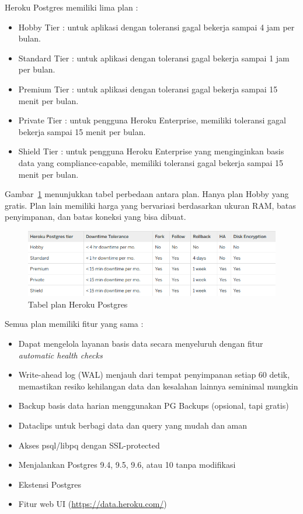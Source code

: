 \documentclass[a4paper,twoside]{article}
\begin{document}
\begin{enumerate}
\begin{enumerate}
\begin{itemize}
Heroku Postgres memiliki lima plan :
\begin{itemize}
\item Hobby Tier : untuk aplikasi dengan toleransi gagal bekerja sampai 4 jam per bulan.
\item Standard Tier : untuk aplikasi dengan toleransi gagal bekerja sampai 1 jam per bulan.
\item Premium Tier : untuk aplikasi dengan toleransi gagal bekerja sampai 15 menit per bulan.
\item Private Tier : untuk pengguna Heroku Enterprise, memiliki toleransi gagal bekerja sampai 15 menit per bulan.
\item Shield Tier : untuk pengguna Heroku Enterprise yang menginginkan basis data yang compliance-capable, memiliki toleransi gagal bekerja sampai 15 menit per bulan.
\end{itemize}

Gambar~\ref{fig:heroku-postgres-plan-table} menunjukkan tabel perbedaan antara plan. Hanya plan Hobby yang gratis. Plan lain memiliki harga yang bervariasi berdasarkan ukuran RAM, batas penyimpanan, dan batas koneksi yang bisa dibuat.
\begin{figure}[H]
	\centering  
	\includegraphics[scale=0.5]{Gambar/heroku-postgres-plan-table.png}  
	\caption[Tabel plan Heroku Postgres]{Tabel plan Heroku Postgres} 
	\label{fig:heroku-postgres-plan-table} 
\end{figure}

Semua plan memiliki fitur yang sama :
\begin{itemize}
\item Dapat mengelola layanan basis data secara menyeluruh dengan fitur \textit{automatic health checks}
\item Write-ahead log (WAL) menjauh dari tempat penyimpanan setiap 60 detik, memastikan resiko kehilangan data dan kesalahan lainnya seminimal mungkin
\item Backup basis data harian menggunakan PG Backups (opsional, tapi gratis)
\item Dataclips untuk berbagi data dan query yang mudah dan aman
\item Akses psql/libpq dengan SSL-protected
\item Menjalankan Postgres 9.4, 9.5, 9.6, atau 10 tanpa modifikasi
\item Ekstensi Postgres
\item Fitur web UI (\url{https://data.heroku.com/})
\end{itemize}


\end{itemize}
\end{enumerate}
\end{enumerate}
\end{document}
